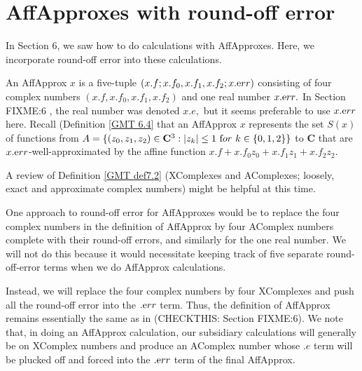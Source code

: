 \chapter{AffApproxes with round-off error}
 
In Section 6, we saw how to do calculations with AffApproxes.  Here, we incorporate round-off error into
these calculations.  

\begin{conventions}\label{GMT 8,1}
An AffApprox $x$ is a five-tuple
$(x.f; x.f_0,x.f_1,x.f_2; x.{\textrm err})$
consisting of four complex numbers $(x.f, x.f_0,x.f_1, x.f_2)$ and one real number $x.{\textrm err}.$  In
	Section FIXME:6 %
, the
real number was denoted $x.e,$ but it seems preferable to use $x.{\textrm err}$ here.  Recall (Definition \ref{GMT 6.4}
that an AffApprox $x$ represents the set $S(x)$ of functions from $A = \{(z_0,z_1,z_2) \in {\mathbf C}^3 : |z_k| \le 1 \
{\textrm for} \ k \in \{0,1,2\}\}$ to ${\mathbf C}$ that are $x.{\textrm err}$-well-approximated by the affine function
$x.f + x.f_0 z_0 + x.f_1 z_1 + x.f_2 z_2.$
\end{conventions}

\begin{remarks} \label{GMT 8.2}
A review of Definition \ref{GMT def7.2} (XComplexes and AComplexes; loosely, exact and approximate complex numbers) might be helpful at this time.

One approach to round-off error for AffApproxes would be to replace the four complex numbers in the definition of AffApprox by four AComplex numbers complete with their round-off errors, and similarly for the one real number.  We will not do this because it would necessitate keeping track of five separate round-off-error terms when we do AffApprox calculations.

Instead, we will 
replace the four complex numbers by four XComplexes and push all the round-off error into the $.{\textrm err}$ term.  
Thus, the definition of AffApprox remains 
essentially the same as in
	(CHECKTHIS: Section FIXME:6).  %
We note that, in doing an AffApprox calculation, our subsidiary calculations will generally be on XComplex numbers and produce an AComplex number whose $.e$ term will be plucked off and forced into the $.{\textrm err}$ term of the final AffApprox.\end{remarks}

